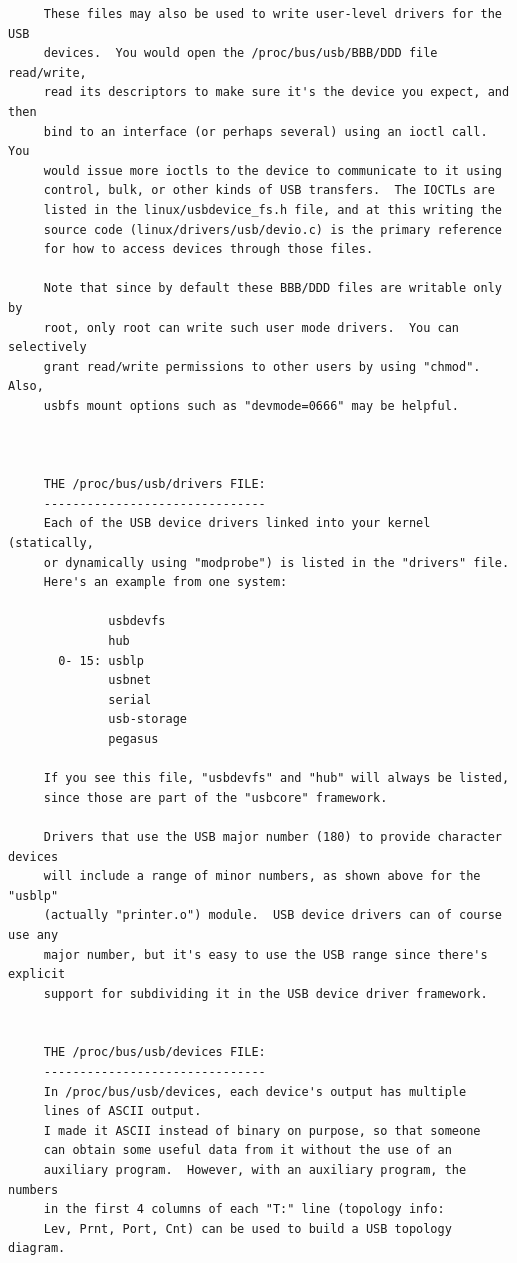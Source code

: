 {{{{{{{{{{{{{{{\begin{verbatim}
     These files may also be used to write user-level drivers for the USB
     devices.  You would open the /proc/bus/usb/BBB/DDD file read/write,
     read its descriptors to make sure it's the device you expect, and then
     bind to an interface (or perhaps several) using an ioctl call.  You
     would issue more ioctls to the device to communicate to it using
     control, bulk, or other kinds of USB transfers.  The IOCTLs are
     listed in the linux/usbdevice_fs.h file, and at this writing the
     source code (linux/drivers/usb/devio.c) is the primary reference
     for how to access devices through those files.
     
     Note that since by default these BBB/DDD files are writable only by
     root, only root can write such user mode drivers.  You can selectively
     grant read/write permissions to other users by using "chmod".  Also,
     usbfs mount options such as "devmode=0666" may be helpful.
     
     
     
     THE /proc/bus/usb/drivers FILE:
     -------------------------------
     Each of the USB device drivers linked into your kernel (statically,
     or dynamically using "modprobe") is listed in the "drivers" file.
     Here's an example from one system:
     
              usbdevfs
              hub
       0- 15: usblp
              usbnet
              serial
              usb-storage
              pegasus
     
     If you see this file, "usbdevfs" and "hub" will always be listed,
     since those are part of the "usbcore" framework.
     
     Drivers that use the USB major number (180) to provide character devices
     will include a range of minor numbers, as shown above for the "usblp"
     (actually "printer.o") module.  USB device drivers can of course use any
     major number, but it's easy to use the USB range since there's explicit
     support for subdividing it in the USB device driver framework.
     
     
     THE /proc/bus/usb/devices FILE:
     -------------------------------
     In /proc/bus/usb/devices, each device's output has multiple
     lines of ASCII output.
     I made it ASCII instead of binary on purpose, so that someone
     can obtain some useful data from it without the use of an
     auxiliary program.  However, with an auxiliary program, the numbers
     in the first 4 columns of each "T:" line (topology info:
     Lev, Prnt, Port, Cnt) can be used to build a USB topology diagram.
     

\end{verbatim}}}}}}}}}}}}}}}}
